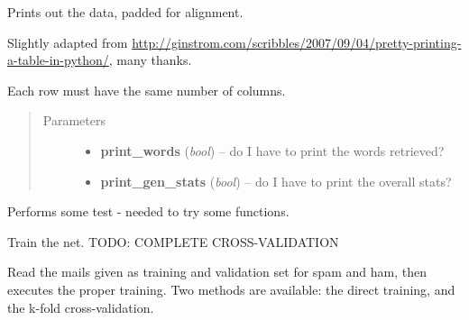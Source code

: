\documentclass[letterpaper,10pt,english]{sphinxmanual}
\begin{document}
\begin{fulllineitems}
\begin{fulllineitems}
\end{fulllineitems}


\begin{fulllineitems}
\label{index:naive_bayes.Bayes.bayes_print}
Prints out the data, padded for alignment.

Slightly adapted from \href{http://ginstrom.com/scribbles/2007/09/04/pretty-printing-a-table-in-python/}{http://ginstrom.com/scribbles/2007/09/04/pretty-printing-a-table-in-python/}, many thanks.

Each row must have the same number of columns.
\begin{quote}\begin{description}
\item[{Parameters}] \leavevmode\begin{itemize}
\item {} 
\textbf{print\_words} (\emph{bool}) -- do I have to print the words retrieved?

\item {} 
\textbf{print\_gen\_stats} (\emph{bool}) -- do I have to print the overall stats?

\end{itemize}

\end{description}\end{quote}

\end{fulllineitems}


\begin{fulllineitems}
\label{index:naive_bayes.Bayes.test_bayes}
Performs some test - needed to try some functions.

\end{fulllineitems}


\begin{fulllineitems}
\label{index:naive_bayes.Bayes.train}
Train the net. TODO: COMPLETE CROSS-VALIDATION

Read the mails given as training and validation set for spam and ham,
then executes the proper training. Two methods are available: the direct
training, and the k-fold cross-validation.


\end{fulllineitems}
\end{fulllineitems}
\end{document}
